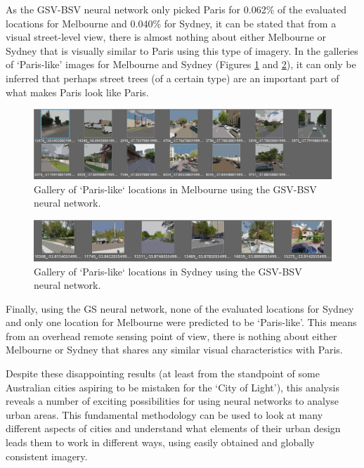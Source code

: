\documentclass[sageh,times]{sagej}
\begin{document}
As the GSV-BSV neural network only picked Paris for 0.062\% of the evaluated locations for Melbourne and 0.040\% for Sydney, it can be stated that from a visual street-level view, there is almost nothing about either Melbourne or Sydney that is visually similar to Paris using this type of imagery. In the galleries of `Paris-like' images for Melbourne and Sydney (Figures \ref{fig:gsv_mel_gallery} and  \ref{fig:gsv_syd_gallery}), it can only be inferred that perhaps street trees (of a certain type) are an important part of what makes Paris look like Paris.

\begin{figure}[!htbp]
\centering    
\includegraphics[scale=0.50]{Images/MelbourneLikeParis/Melbourne_streetview_gallery.png} 
\caption{Gallery of `Paris-like` locations in Melbourne using the GSV-BSV neural network.}    
 \label{fig:gsv_mel_gallery}  
\end{figure} 

\begin{figure}[!htbp]
\centering    
\includegraphics[scale=0.50]{Images/SydneyLikeParis/Sydney_streetview_gallery.png} 
\caption{Gallery of `Paris-like` locations in Sydney using the GSV-BSV neural network.}    
 \label{fig:gsv_syd_gallery}  
\end{figure} 



Finally, using the GS neural network, none of the evaluated locations for Sydney and only one location for Melbourne were predicted to be `Paris-like'. This means from an overhead remote sensing point of view, there is nothing about either Melbourne or Sydney that shares any similar visual characteristics with Paris.

Despite these disappointing results (at least from the standpoint of some Australian cities aspiring to be mistaken for the `City of Light'), this analysis reveals a number of exciting possibilities for using neural networks to analyse urban areas. This fundamental methodology can be used to look at many different aspects of cities and understand what elements of their urban design leads them to work in different ways, using easily obtained and globally consistent imagery. 
\end{document}
